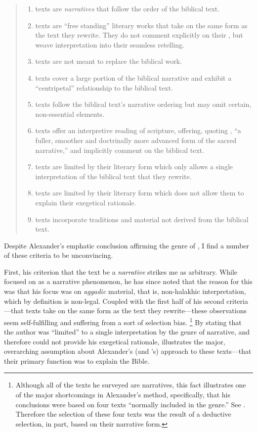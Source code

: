 \begin{quote}
\begin{enumerate}
    \item \rwb texts are \emph{narratives} that follow the order of the biblical text. 
    \item \rwb texts are ``free standing'' literary works that take on the same form as the text they rewrite. They do not comment explicitly on their \vorlagen, but weave interpretation into their seamless retelling. 
    \item \rwb texts are not meant to replace the biblical work. 
    \item \rwb texts cover a large portion of the biblical narrative and exhibit a ``centripetal'' relationship to the biblical text. 
    \item \rwb texts follow the biblical text's narrative ordering but may omit certain, non-essential elements. 
    \item \rwb texts offer an interpretive reading of scripture, offering, quoting \vermes, ``a fuller, smoother and doctrinally more advanced form of the sacred narrative,''\autocite[Citing \vermes in][305]{schurer1986} and implicitly comment on the biblical text. 
    \item \rwb texts are limited by their literary form which only allows a single interpretation of the biblical text that they rewrite. 
    \item \rwb texts are limited by their literary form which does not allow them to explain their exegetical rationale. 
    \item \rwb texts incorporate traditions and material not derived from the biblical text.%
        \autocite{alexander_carson-williamson1988}
\end{enumerate}
\end{quote} 

Despite Alexander's emphatic conclusion affirming the genre of \rwb, I find a number of these criteria to be unconvincing.

First, his criterion that the text be a \emph{narrative} strikes me as arbitrary. While \vermes focused on \rwb as a narrative phenomenon, he has since noted that the reason for this was that his focus was on \emph{aggadic} material, that is, non-halakhic interpretation, which by definition is non-legal. Coupled with the first half of his second criteria---that \rwb texts take on the same form as the text they rewrite---these observations seem self-fulfilling and suffering from a sort of selection bias.%
    \footnote{%
        Although all of the texts he surveyed are narratives, this fact illustrates one of the major shortcomings in Alexander's method, specifically, that his conclusions were based on four texts ``normally included in the genre.'' See 
        \cite[99]{alexander_carson-williamson1988}. 
        Therefore the selection of these four texts was the result of a deductive selection, in part, based on their narrative form.}
By stating that the author was ``limited'' to a single interpretation by the genre of narrative, and therefore could not provide his exegetical rationale, illustrates the major, overarching assumption about Alexander's (and \vermes's) approach to these texts---that their primary function was to explain the Bible.

